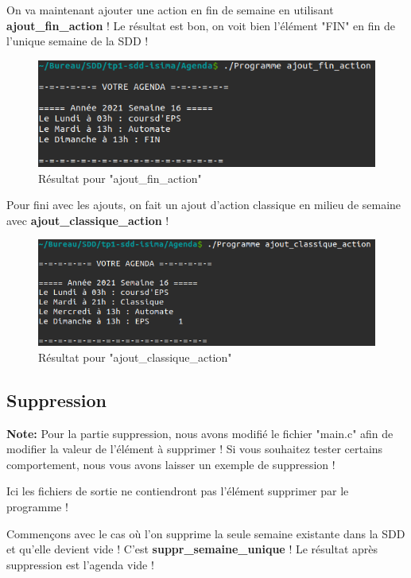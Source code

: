 \documentclass[12pt,french]{article} %
\begin{document}
On va maintenant ajouter une action en fin de semaine en utilisant \textbf{ajout\_fin\_action} ! Le résultat est bon, on voit bien l'élément "FIN" en fin de l'unique semaine de la SDD !\newline

\begin{figure}[H]
	\includegraphics[scale=0.6]{aj-fac.png}
	\centering
	\caption{Résultat pour "ajout\_fin\_action"}
\end{figure}

Pour fini avec les ajouts, on fait un ajout d'action classique en milieu de semaine avec \textbf{ajout\_classique\_action} !\newline

\begin{figure}[H]
	\includegraphics[scale=0.6]{aj-cac.png}
	\centering
	\caption{Résultat pour "ajout\_classique\_action"}
\end{figure}

\subsection{Suppression}

\textbf{Note:} Pour la partie suppression, nous avons modifié le fichier "main.c" afin de modifier la valeur de l'élément à supprimer ! Si vous souhaitez tester certains comportement, nous vous avons laisser un exemple de suppression !

Ici les fichiers de sortie ne contiendront pas l'élément supprimer par le programme ! \newline

Commençons avec le cas où l'on supprime la seule semaine existante dans la SDD et qu'elle devient vide ! C'est \textbf{suppr\_semaine\_unique} ! Le résultat après suppression est l'agenda vide !\newline
\end{document}
